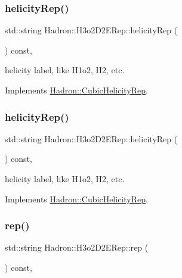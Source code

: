 \subsubsection{\texorpdfstring{helicityRep()}{helicityRep()}\hspace{0.1cm}{\footnotesize\ttfamily [2/3]}}
{\footnotesize\ttfamily std\+::string Hadron\+::\+H3o2\+D2\+E\+Rep\+::helicity\+Rep (\begin{DoxyParamCaption}{ }\end{DoxyParamCaption}) const\hspace{0.3cm}{\ttfamily [inline]}, {\ttfamily [virtual]}}

helicity label, like H1o2, H2, etc. 

Implements \mbox{\hyperlink{structHadron_1_1CubicHelicityRep_af1096946b7470edf0a55451cc662f231}{Hadron\+::\+Cubic\+Helicity\+Rep}}.

\mbox{\label{structHadron_1_1H3o2D2ERep_ad3100dd02c2f3ec837e4d589a732d956}} 
\subsubsection{\texorpdfstring{helicityRep()}{helicityRep()}\hspace{0.1cm}{\footnotesize\ttfamily [3/3]}}
{\footnotesize\ttfamily std\+::string Hadron\+::\+H3o2\+D2\+E\+Rep\+::helicity\+Rep (\begin{DoxyParamCaption}{ }\end{DoxyParamCaption}) const\hspace{0.3cm}{\ttfamily [inline]}, {\ttfamily [virtual]}}

helicity label, like H1o2, H2, etc. 

Implements \mbox{\hyperlink{structHadron_1_1CubicHelicityRep_af1096946b7470edf0a55451cc662f231}{Hadron\+::\+Cubic\+Helicity\+Rep}}.

\mbox{\label{structHadron_1_1H3o2D2ERep_a62c37bd67dbe2ba7fd36b57f0a069aa7}} 
\subsubsection{\texorpdfstring{rep()}{rep()}\hspace{0.1cm}{\footnotesize\ttfamily [1/5]}}
{\footnotesize\ttfamily std\+::string Hadron\+::\+H3o2\+D2\+E\+Rep\+::rep (\begin{DoxyParamCaption}{ }\end{DoxyParamCaption}) const\hspace{0.3cm}{\ttfamily [inline]}, {\ttfamily [virtual]}}



